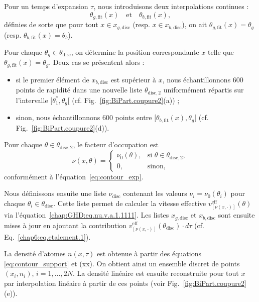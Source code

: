 \medskip

Pour un temps d’expansion \(\tau\), nous introduisons deux interpolations continues :
\[
\theta_{g,\mathrm{fit}}(x) \quad \text{et} \quad \theta_{b,\mathrm{fit}}(x),
\]
définies de sorte que pour tout \(x \in x_{g,\mathrm{disc}}\) (resp. \(x \in x_{b,\mathrm{disc}}\)), on ait \(\theta_{g,\mathrm{fit}}(x) = \theta_g\) (resp. \(\theta_{b,\mathrm{fit}}(x) = \theta_b\)).  

Pour chaque \(\theta_g \in \theta_{\mathrm{disc}}\), on détermine la position correspondante \(x\) telle que \(\theta_{g,\mathrm{fit}}(x) = \theta_g\).  
Deux cas se présentent alors :
\begin{itemize}[label = $\bullet$]
	\item si le premier élément de \(x_{b,\mathrm{disc}}\) est supérieur à \(x\), nous échantillonnons \(600\) points de rapidité dans une nouvelle liste \(\theta_{\mathrm{disc},2}\) uniformément répartis sur l’intervalle \([\theta_1^*,\theta_g[\) (cf. Fig.~\ref{fig:BiPart.coupure2}(a)) ;
	\item sinon, nous échantillonnons \(600\) points entre \([\theta_{b,\mathrm{fit}}(x),\theta_g[\) (cf. Fig.~\ref{fig:BiPart.coupure2}(d)).
\end{itemize}


Pour chaque \(\theta \in \theta_{\mathrm{disc},2}\), le facteur d’occupation est
\[
\nu(x,\theta) = 
\begin{cases}
\nu_0(\theta), & \text{si } \theta \in \theta_{\mathrm{disc},2}, \\
0, & \text{sinon},
\end{cases}
\]
conformément à l’équation~\eqref{eq:contour_exp}.

\medskip

Nous définissons ensuite une liste \(\nu_{\mathrm{disc}}\) contenant les valeurs \(\nu_i = \nu_0(\theta_i)\) pour chaque \(\theta_i \in \theta_{\mathrm{disc}}\).  
Cette liste permet de calculer la vitesse effective
\(
v^{\mathrm{eff}}_{[\nu(x,\cdot)]}(\theta)
\)
via l’équation~\eqref{chap:GHD:eq.nu.v.a.1.1111}.  
Les listes \(x_{g,\mathrm{disc}}\) et \(x_{b,\mathrm{disc}}\) sont ensuite mises à jour en ajoutant la contribution
\(
v^{\mathrm{eff}}_{[\nu(x,\cdot)]}(\theta_{\mathrm{disc}}) \cdot d\tau
\)
(cf. Eq.~\eqref{chap6:eq.etalement.1}).

\medskip

La densité d’atomes \(n(x,\tau)\) est obtenue à partir des équations \eqref{eq:contour_support} et (xx).  
On obtient ainsi un ensemble discret de points \((x_i,n_i)\), \(i=1,\dots,2N\).  
La densité linéaire est ensuite reconstruite pour tout \(x\) par interpolation linéaire à partir de ces points (voir Fig.~\ref{fig:BiPart.coupure2}(e)).

